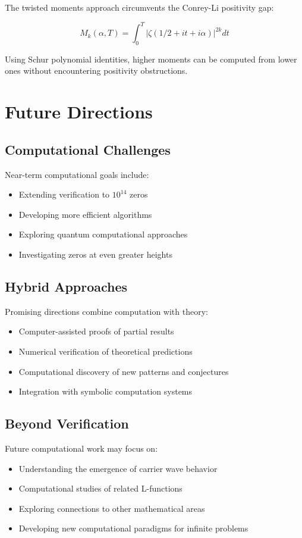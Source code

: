 The twisted moments approach circumvents the Conrey-Li positivity gap:

\begin{equation}
M_k(\alpha, T) = \int_0^T |\zeta(1/2 + it + i\alpha)|^{2k} dt
\end{equation}

Using Schur polynomial identities, higher moments can be computed from lower ones without encountering positivity obstructions.

\section{Future Directions}
\label{sec:future-directions}

\subsection{Computational Challenges}

Near-term computational goals include:
\begin{itemize}
\item Extending verification to $10^{14}$ zeros
\item Developing more efficient algorithms
\item Exploring quantum computational approaches
\item Investigating zeros at even greater heights
\end{itemize}

\subsection{Hybrid Approaches}

Promising directions combine computation with theory:
\begin{itemize}
\item Computer-assisted proofs of partial results
\item Numerical verification of theoretical predictions
\item Computational discovery of new patterns and conjectures
\item Integration with symbolic computation systems
\end{itemize}

\subsection{Beyond Verification}

Future computational work may focus on:
\begin{itemize}
\item Understanding the emergence of carrier wave behavior
\item Computational studies of related L-functions
\item Exploring connections to other mathematical areas
\item Developing new computational paradigms for infinite problems
\end{itemize}

